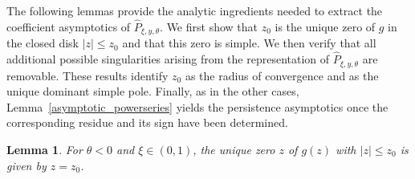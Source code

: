 \documentclass[10pt,a4paper]{amsart}
\newcommand{\1}{\mathds{1}}
\newtheorem{Lemma}[definition]{Lemma}
\begin{document}
The following lemmas provide the analytic ingredients needed to extract the coefficient asymptotics of $\hat{P}_{\xi,y,\theta}$. We first show that $z_0$ is the unique zero of $g$ in the closed disk $|z|\leq z_0$ and that this zero is simple. We then verify that all additional possible singularities arising from the representation of $\hat{P}_{\xi,y,\theta}$ are removable. These results identify $z_0$ as the radius of convergence and as the unique dominant simple pole. Finally, as in the other cases, Lemma~\ref{asymptotic_powerseries} yields the
persistence asymptotics once the corresponding residue and its
sign have been determined.
\begin{Lemma}\label{zeros_g_neg_theta}
    For $\theta<0$ and $\xi\in(0,1)$, the unique zero $z$ of $g(z)$ with $|z|\le z_0$ is given by $z=z_0$. 
\end{Lemma}
\end{document}

